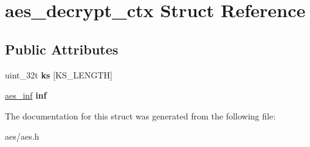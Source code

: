 \hypertarget{structaes__decrypt__ctx}{}\section{aes\+\_\+decrypt\+\_\+ctx Struct Reference}
\label{structaes__decrypt__ctx}
\subsection*{Public Attributes}
\begin{DoxyCompactItemize}
\item 
uint\+\_\+32t {\bfseries ks} \mbox{[}K\+S\+\_\+\+L\+E\+N\+G\+TH\mbox{]}\hypertarget{structaes__decrypt__ctx_ae73bb4193e48623a3939af46a30cf890}{}\label{structaes__decrypt__ctx_ae73bb4193e48623a3939af46a30cf890}

\item 
\hyperlink{unionaes__inf}{aes\+\_\+inf} {\bfseries inf}\hypertarget{structaes__decrypt__ctx_a7c1710d7068f47e56165a089aedbbefb}{}\label{structaes__decrypt__ctx_a7c1710d7068f47e56165a089aedbbefb}

\end{DoxyCompactItemize}


The documentation for this struct was generated from the following file\+:\begin{DoxyCompactItemize}
\item 
aes/aes.\+h\end{DoxyCompactItemize}
